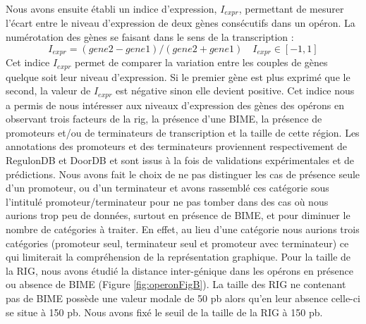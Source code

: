 \documentclass[12pt,a4paper]{report}
\begin{document}
\begin{onehalfspace}
Nous avons ensuite établi un indice d'expression, $I_{expr}$, permettant de mesurer l'écart entre le niveau d'expression de deux gènes consécutifs dans un opéron. La numérotation des gènes se faisant dans le sens de la transcription :
\[ I_{expr} = (gene2 - gene1) / (gene2 + gene1) \quad I_{expr} \in [-1,1]\]
Cet indice $I_{expr}$ permet de comparer la variation entre les couples de gènes quelque soit leur niveau d'expression. Si le premier gène est plus exprimé que le second, la valeur de $I_{expr}$ est négative sinon elle devient positive. Cet indice nous a permis de nous intéresser aux niveaux d'expression des gènes des opérons en observant trois facteurs de la \gls{rig}, la présence d'une BIME, la présence de promoteurs et/ou de terminateurs de transcription et la taille de cette région. Les annotations des promoteurs et des terminateurs proviennent respectivement de RegulonDB et DoorDB et sont issus à la fois de validations expérimentales et de prédictions. Nous avons fait le choix de ne pas distinguer les cas de présence seule d'un promoteur, ou d'un terminateur et avons rassemblé ces catégorie sous l'intitulé promoteur/terminateur pour ne pas tomber dans des cas où nous aurions trop peu de données, surtout en présence de BIME, et pour diminuer le nombre de catégories à traiter. En effet, au lieu d'une catégorie nous aurions trois catégories (promoteur seul, terminateur seul et promoteur avec terminateur) ce qui limiterait la compréhension de la représentation graphique. Pour la taille de la RIG, nous avons étudié la distance inter-génique dans les opérons en présence ou absence de BIME (Figure \autoref{fig:operonFigB}). La taille des RIG ne contenant pas de BIME possède une valeur modale de 50 pb alors qu'en leur absence celle-ci se situe à 150 pb. Nous avons fixé le seuil de la taille de la RIG à 150 pb.


\end{onehalfspace}
\end{document}
